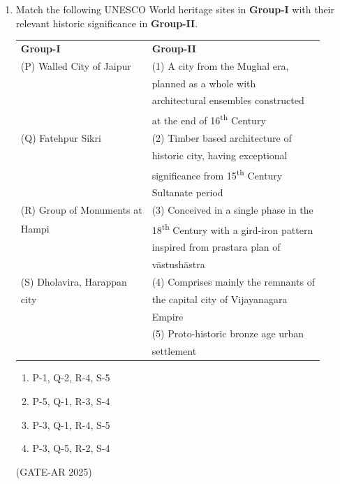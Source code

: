 \documentclass[a4paper,10pt]{article}
\begin{document}
\begin{enumerate}
    \item Match the following UNESCO World heritage sites in \textbf{Group-I} with their relevant historic significance in \textbf{Group-II}. \\
    \begin{tabular}{ l l }
    \textbf{Group-I} & \textbf{Group-II} \\
    (P) Walled City of Jaipur & (1) A city from the Mughal era, \\
    & planned as a whole with \\
    & architectural ensembles constructed \\
    & at the end of 16\textsuperscript{th} Century \\
    (Q) Fatehpur Sikri & (2) Timber based architecture of \\
    & historic city, having exceptional \\
    & significance from 15\textsuperscript{th} Century \\
    & Sultanate period \\
    (R) Group of Monuments at & (3) Conceived in a single phase in the \\
    Hampi & 18\textsuperscript{th} Century with a gird-iron pattern \\
    & inspired from prastara plan of \\
    & vāstushāstra \\
    (S) Dholavira, Harappan & (4) Comprises mainly the remnants of \\
    city & the capital city of Vijayanagara \\
    & Empire \\
    & (5) Proto-historic bronze age urban \\
    & settlement \\
    \end{tabular}
    \begin{multicols}{2}
    \begin{enumerate}
        \item P-1, Q-2, R-4, S-5
        \item P-5, Q-1, R-3, S-4
        \item P-3, Q-1, R-4, S-5
        \item P-3, Q-5, R-2, S-4
    \end{enumerate}
    \end{multicols}
    \hfill (GATE-AR 2025)


\end{enumerate}
\end{document}
